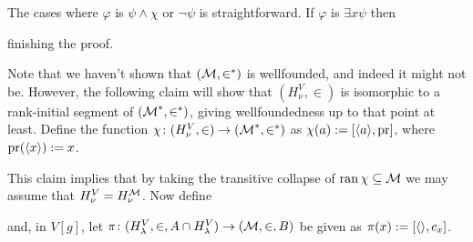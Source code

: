 \documentclass[../../main]{subfiles}
\begin{document}
{{    The cases where $\varphi$ is $\psi\land\chi$ or $\lnot\psi$ is straightforward. If $\varphi$ is $\exists x\psi$ then

    finishing the proof.
  }

  Note that we haven't shown that $(\operatorname{\mathcal M},\in^*)$ is wellfounded, and indeed it might not be. However, the following claim will show that $(H_\nu^V,\in)$ is isomorphic to a rank-initial segment of $(\operatorname{\mathcal M}^*, \in^*)$, giving wellfoundedness up to that point at least. Define the function $\chi\colon(H_\nu^V,\in)\to(\operatorname{\mathcal M}^*,\in^*)$ as $\chi(a):=[\langle a\rangle,\text{pr}]$, where $\text{pr}(\langle x\rangle) := x$.



  This claim implies that by taking the transitive collapse of $\operatorname{ran}\chi\subseteq\operatorname{\mathcal M}$ we may assume that $H_\nu^V = H_\nu^{\operatorname{\mathcal M}}$. Now define
  
  and, in $V[g]$, let $\pi\colon (H_\lambda^V,\in,A\cap H_\lambda^V)\to(\operatorname{\mathcal M},\in, B)$ be given as $\pi(x) := [\langle \rangle,c_x]$. 
  

}
\end{document}
